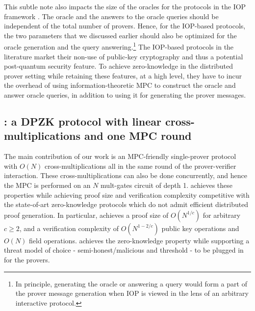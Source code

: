This subtle note also impacts the size of the oracles for the protocols in the IOP framework \cite{aurora, ligero}. The oracle and the answers to the oracle queries should be independent of the total number of provers. Hence, for the IOP-based protocols, the two parameters that we discussed earlier should also be optimized for the oracle generation and the query answering.\footnote{In principle, generating the oracle or answering a query would form a part of the prover message generation when IOP is viewed in the lens of an arbitrary interactive protocol.}
The IOP-based protocols in the literature \cite{aurora, ligero} market their non-use of public-key cryptography and thus a potential post-quantum security feature. To achieve zero-knowledge in the distributed prover setting while retaining these features, at a high level, they have to incur the overhead of using information-theoretic MPC to construct the oracle and answer oracle queries, in addition to using it for generating the prover messages.

\subsection{\name{}: a DPZK protocol with linear cross-multiplications and one MPC round}
The main contribution of our work is an MPC-friendly single-prover protocol \name{} with $O(N)$ cross-multiplications all in the same round of the prover-verifier interaction. These cross-multiplications can also be done concurrently, and hence the MPC is performed on an $N$ mult-gates circuit of depth 1. \name{} achieves these properties while achieving proof size and verification complexity competitive with the state-of-art zero-knowledge protocols which do not admit efficient distributed proof generation. In particular, \name{} achieves a proof size of $O(N^{1/c})$ for arbitrary $c\geq 2$, and a verification complexity of $O(N^{1-2/c})$ public key operations and $O(N)$ field operations. \name{} achieves the zero-knowledge property while supporting a threat model of choice - semi-honest/malicious and threshold - to be plugged in for the provers.

